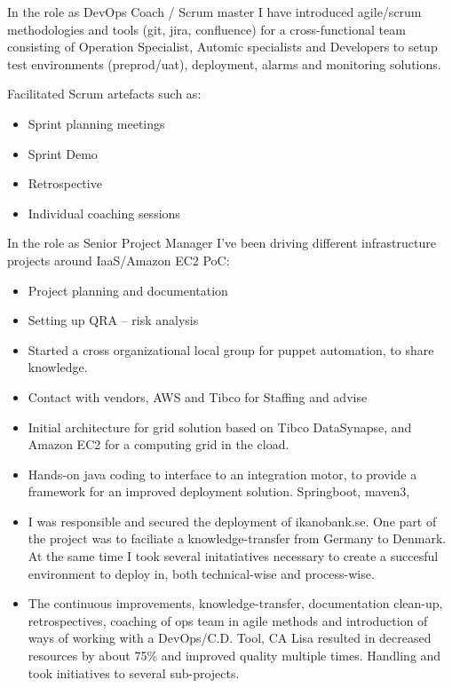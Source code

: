 \documentclass[11pt,a4paper,sans]{moderncv}
\begin{document}
{  
In the role as DevOps Coach / Scrum master I have introduced agile/scrum methodologies and tools (git, jira, confluence) for a cross-functional team consisting of Operation Specialist, Automic specialists and Developers to setup test environments (preprod/uat), deployment, alarms and monitoring solutions. 

Facilitated Scrum artefacts such as: 
\begin{itemize}
    \item Sprint planning meetings 
    \item Sprint Demo 
    \item Retrospective 
    \item Individual coaching sessions 
\end{itemize}

In the role as Senior Project Manager I’ve been driving different infrastructure projects around IaaS/Amazon EC2 PoC: 
\begin{itemize}
    \item Project planning and documentation 
    \item Setting up QRA – risk analysis  
    \item Started a cross organizational local group for puppet automation, to share knowledge.
    \item Contact with vendors, AWS and Tibco for Staffing and advise 
    \item Initial architecture for grid solution based on Tibco DataSynapse, and Amazon EC2 for a computing grid in the cload. 
    \item Hands-on java coding to interface to an integration motor, to provide a framework for an improved deployment solution. Springboot, maven3,  
\end{itemize}


\begin{itemize}
    \item I was responsible and secured the deployment of ikanobank.se. One part of the project was to faciliate a knowledge-transfer from Germany to Denmark. At the same time I took several initatiatives necessary to create a succesful environment to deploy in, both technical-wise and process-wise. 
    
    \item The continuous improvements, knowledge-transfer, documentation clean-up, retrospectives, coaching of ops team in agile methods and introduction of ways of working with a DevOps/C.D. Tool, CA Lisa resulted in decreased resources by about 75\% and improved quality multiple times. Handling and took initiatives to several sub-projects. 
    

\end{itemize}}
\end{document}
